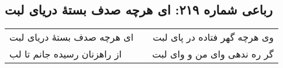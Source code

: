 \begin{center}
\section*{رباعی شماره ۲۱۹: ای هرچه صدف بستهٔ دریای لبت}
\label{sec:0219}
\begin{longtable}{l p{0.5cm} r}
ای هرچه صدف بستهٔ دریای لبت
&&
وی هرچه گهر فتاده در پای لبت
\\
از راهزنان رسیده جانم تا لب
&&
گر ره ندهی وای من و وای لبت
\\
\end{longtable}
\end{center}
